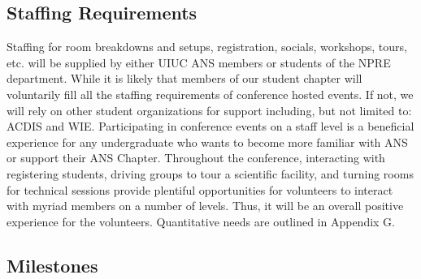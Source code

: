 \subsection{Staffing Requirements}
Staffing for room breakdowns and setups, registration, socials, workshops, tours, etc.  will be supplied by either UIUC ANS members or students of the NPRE department. While it is likely that members of our student chapter will voluntarily fill all the staffing requirements of conference hosted events. If not, we will rely on other student organizations for support including, but not limited to: ACDIS and WIE. Participating in conference events on a staff level is a beneficial experience for any undergraduate who wants to become more familiar with ANS or support their ANS Chapter. Throughout the conference, interacting with registering students, driving groups to tour a scientific facility, and turning rooms for technical sessions provide plentiful opportunities for volunteers to interact with myriad members on a number of levels. Thus, it will be an overall positive experience for the volunteers. Quantitative needs are outlined in Appendix G.

\subsection{Milestones}

